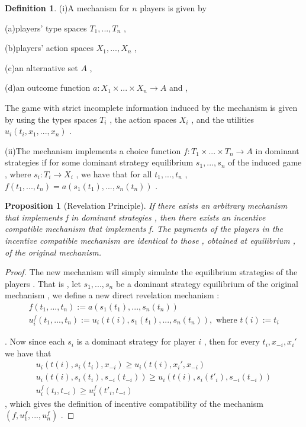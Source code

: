 \documentclass[10pt,reqno]{amsart}
\newtheorem{pro}{Proposition}[section]
\theoremstyle{definition}
\newtheorem{defn}{Definition}[section]
\theoremstyle{remark}
\numberwithin{equation}{section}
\begin{document}
\begin{defn}
(i)A mechanism for $n$ players is given by

(a)players' type spaces $T_1,...,T_n$ ,

(b)players' action spaces $X_1,...,X_n$ ,

(c)an alternative set $A$ ,

(d)an outcome function $a:X_1\times...\times X_n\rightarrow A$ and ,


The game with strict incomplete information induced by the mechanism is given by using the types spaces $T_i$ , the action spaces $X_i$ , and the utilities $u_i(t_i,x_1,...,x_n)$ .

(ii)The mechanism implements a choice function $f:T_1\times...\times T_n\rightarrow A$ in dominant strategies if for some dominant strategy equilibrium $s_1,...,s_n$ of the induced game , where $s_i:T_i\rightarrow X_i$ , we have that for all $t_1,...,t_n$ , $f(t_1,...,t_n)=a(s_1(t_1),...,s_n(t_n))$ .

\end{defn}

\begin{pro}[Revelation Principle]
If there exists an arbitrary mechanism that implements f in dominant strategies , then there exists an incentive compatible mechanism that implements f. The payments of the players in the incentive compatible mechanism are identical to those , obtained at equilibrium , of the original mechanism.
\end{pro}

\begin{proof}
The new mechanism will simply simulate the equilibrium strategies of the players . That is , let $s_1,...,s_n$ be a dominant strategy equilibrium of the original mechanism , we define a new direct revelation mechanism : 
\begin{eqnarray}
f(t_1,...,t_n):=a(s_1(t_1),...,s_n(t_n)) \\
 u_i^f(t_1,...,t_n):=u_i(t(i), s_1(t_1),...,s_n(t_n)), \text{ where } t(i) := t_i
\end{eqnarray}

 . Now since each $s_i$ is a dominant strategy for player $i$ , then for every $t_i,x_{-i},x_i'$ we have that 
\begin{eqnarray}
 u_i(t(i),   s_i(t_i),x_{-i})\ge u_i(t(i),x_i',x_{-i})\\
 u_i\left(t(i),   s_i(t_i),s_{-i}(t_{-i})  \right) \ge  u_i\left(t(i),   s_i(t'_i),s_{-i}(t_{-i})  \right) \\
 u_i^f(t_i,t_{-i} )\geq u_i^f(t'_i,t_{-i} )
\end{eqnarray}
, which gives the definition of incentive compatibility of the mechanism $(f,u_1^f,...,u_n^f)$ .

\end{proof}
\end{document}

